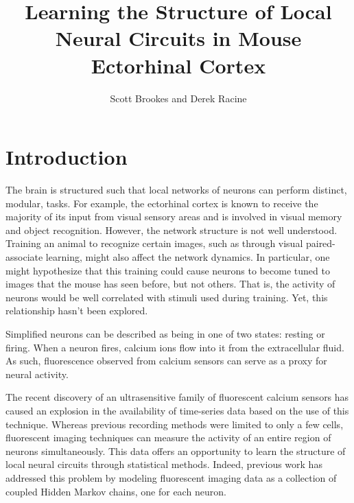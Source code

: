 \documentclass{article}
\begin{document}
\title{Learning the Structure of Local Neural Circuits in Mouse Ectorhinal Cortex}
\author{Scott Brookes and Derek Racine}

\maketitle

\section*{Introduction}
The brain is structured such that local networks of neurons can perform 
distinct, modular, tasks. For example, the ectorhinal cortex is known to 
receive the majority of its input from visual sensory areas and is involved 
in visual memory and object recognition. However, the network structure is 
not well understood. Training an animal to recognize certain images, such as 
through visual paired-associate learning, might also affect the network 
dynamics. In particular, one might hypothesize that this training could cause 
neurons to become tuned to images that the mouse has seen before, but not 
others. That is, the activity of neurons would be well correlated with 
stimuli used during training. Yet, this relationship hasn't been 
explored. \par 

Simplified neurons can be described as being in one of two states: resting or 
firing. When a neuron fires, calcium ions flow into it from the extracellular 
fluid. As such, fluorescence observed from calcium sensors can serve as a 
proxy for neural activity. \par

The recent discovery of an ultrasensitive family of fluorescent calcium 
sensors has caused an explosion in the availability of time-series data based 
on the use of this technique.\cite{chen13} Whereas previous recording methods 
were limited to only a few cells, fluorescent imaging techniques can measure 
the activity of an entire region of neurons simultaneously. This data offers 
an opportunity to learn the structure of local neural circuits through 
statistical methods. Indeed, previous work has addressed this problem by 
modeling fluorescent imaging data as a collection of coupled Hidden Markov 
chains, one for each neuron.\cite{mishchenko11} \par

\end{document}
